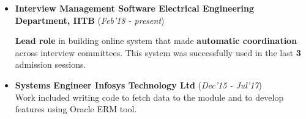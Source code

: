 \documentclass[10pt]{article}
\begin{document}
\colorbox{bl}{}

\begin{itemize}[leftmargin=0.4cm]
    \item \textbf{Interview Management Software \textpipe \hspace{0.05cm} Electrical Engineering Department, IITB} \hfill{(\textit{Feb'18 - present})}

\textbf{Lead role} in building online system that made \textbf{automatic coordination} across interview committees. This system was successfully used in the last \textbf{3} admission sessions.

\end{itemize}
    

\begin{itemize}[leftmargin=0.4cm]
    \item \textbf{Systems Engineer \textpipe  \hspace{0.05cm} Infosys Technology Ltd} \hfill{(\textit{Dec'15 - Jul'17})}\\
         Work included writing code to fetch data to the module and to develop features using Oracle ERM tool.
\end{itemize}


\colorbox{bl}{}
\end{document}
